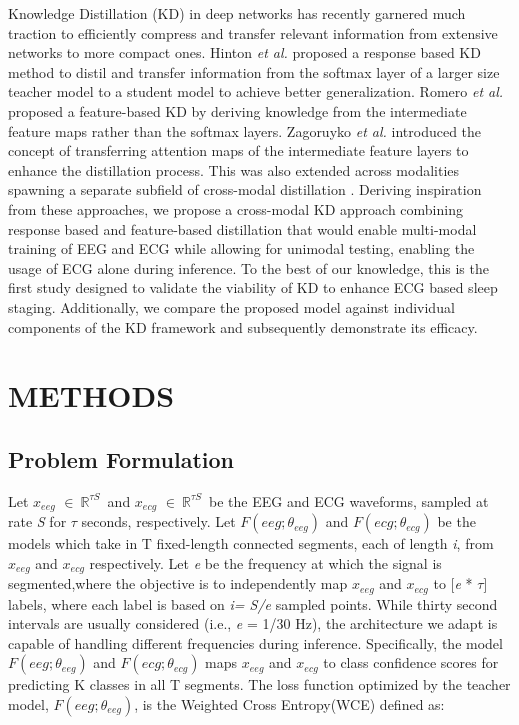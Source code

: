 \documentclass[letterpaper, 10 pt, conference]{ieeeconf}
\begin{document}
Knowledge Distillation (KD) in deep networks has recently garnered much traction to efficiently compress and transfer relevant information from extensive networks to more compact ones. Hinton \textit{et al.} \cite{hinton2015distilling} proposed a response based KD method to distil and transfer information from the softmax layer of a larger size teacher model to a student model to achieve better generalization. Romero \textit{et al.} \cite{romero2014fitnets} proposed a feature-based KD by deriving knowledge from the intermediate feature maps rather than the softmax layers. Zagoruyko \textit{et al.} \cite{komodakis2017paying} introduced the concept of transferring attention maps of the intermediate feature layers to enhance the distillation process. This was also extended across modalities spawning a separate subfield of cross-modal distillation \cite{gou2021knowledge}.
Deriving inspiration from these approaches, we propose a cross-modal KD approach combining response based and feature-based distillation that would enable multi-modal training of EEG and ECG while allowing for unimodal testing, enabling the usage of ECG alone during inference. To the best of our knowledge, this is the first study designed to validate the viability of KD to enhance ECG based sleep staging. Additionally, we compare the proposed model against individual components of the KD framework and subsequently demonstrate its efficacy.

\section{METHODS}
\subsection{Problem Formulation}



Let $x_{eeg}$ $ \in\ \mathbb{R}^{\tau S} $\ and $x_{ecg}$ $ \in\ \mathbb{R}^{ \tau S} $\ be the EEG and ECG waveforms, sampled at rate \textit{S} for $ \tau $ seconds, respectively. Let $F(eeg; \theta_{eeg})$ and $F(ecg; \theta_{ecg})$ be the models which take in T fixed-length connected
segments, each of length \textit{i}, from $x_{eeg}$ and $x_{ecg}$ respectively. Let \textit{e}  be the frequency at which the signal is segmented,where the objective is to independently map $x_{eeg}$ and $x_{ecg}$ to [\textit{e} * $\tau$] labels,
where each label is based on \textit{i= S/\textit{e}} sampled points. While thirty second intervals are usually considered (i.e., \textit{e} = 1/30 Hz), the architecture we adapt is capable of handling different frequencies during inference. Specifically, the model $F(eeg; \theta_{eeg})$ and $F(ecg; \theta_{ecg})$
maps $x_{eeg}$ and $x_{ecg}$ to class confidence scores for predicting K
classes in all T segments. The loss function optimized by the teacher model, $F(eeg; \theta_{eeg})$, is the Weighted Cross Entropy(WCE) defined as:
\end{document}
